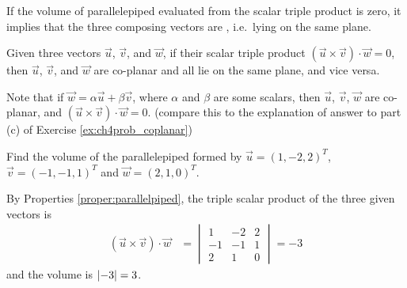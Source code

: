 If the volume of parallelepiped evaluated from the scalar triple product is zero, it implies that the three composing vectors are , i.e.\ lying on the same plane.
\begin{proper}
Given three vectors $\vec{u}$, $\vec{v}$, and $\vec{w}$, if their scalar triple product $(\vec{u} \times \vec{v}) \cdot \vec{w} = 0$, then $\vec{u}$, $\vec{v}$, and $\vec{w}$ are co-planar and all lie on the same plane, and vice versa.
\end{proper}
Note that if $\vec{w} = \alpha \vec{u} + \beta \vec{v}$, where $\alpha$ and $\beta$ are some scalars, then $\vec{u}$, $\vec{v}$, $\vec{w}$ are co-planar, and $(\vec{u} \times \vec{v}) \cdot \vec{w} = 0$. (compare this to the explanation of answer to part (c) of Exercise \ref{ex:ch4prob_coplanar})

\begin{exmp}
Find the volume of the parallelepiped formed by $\vec{u} = (1,-2,2)^T$, $\vec{v}=(-1,-1,1)^T$ and $\vec{w}=(2,1,0)^T$.
\end{exmp}
\begin{solution}
By Properties \ref{proper:parallelpiped}, the triple scalar product of the three given vectors is
\begin{align*}
(\vec{u} \times \vec{v}) \cdot \vec{w} &=
\begin{vmatrix}
1 & -2 & 2 \\
-1 & -1 & 1 \\
2 & 1 & 0
\end{vmatrix}
= -3
\end{align*}
and the volume is $\abs{-3} = 3$.
\end{solution}

